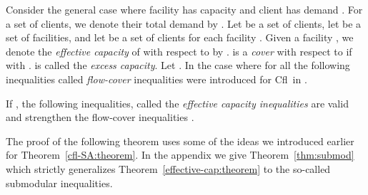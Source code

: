 \documentclass[11pt]{article}
\newcommand{\cfl}{{\sc Cfl}}
\begin{document}
Consider the  general case where  facility  has capacity   and
client   has demand  .  For  a set   of clients,  we denote
their total demand by . Let  be
a set of clients, let  be a set of facilities, and let  be a set of clients for each facility . Given a  facility , we denote the  \emph{effective capacity} of
 with respect to  by .
  is a \emph{cover} with respect to   if   with .   is  called  the \emph{excess
  capacity}. Let .  In the case where  for
all    the  following inequalities  called  \emph{flow-cover}
inequalities were introduced for \cfl\ in \cite{AardalPW95}. 

\vspace*{-0.1cm}
\begin{center}

\end{center}
\vspace*{-0.2cm}

\begin{comment}
For the families of instances that we consider with uniform capacities and unit client demands, the above inequalities are simplified to:
\begin{center}

\end{center}
\end{comment}

If , the following inequalities,
called the {\em effective capacity inequalities} are  valid and strengthen the flow-cover inequalities \cite{AardalPW95}.
\begin{center}
 
\end{center}
\vspace*{-0.3cm}
The proof of the following theorem uses some of the ideas we introduced
earlier for Theorem~\ref{cfl-SA:theorem}. In the appendix we give
Theorem~\ref{thm:submod} which strictly 
generalizes 
Theorem~\ref{effective-cap:theorem} 
to the  so-called submodular inequalities. 
\end{document}
